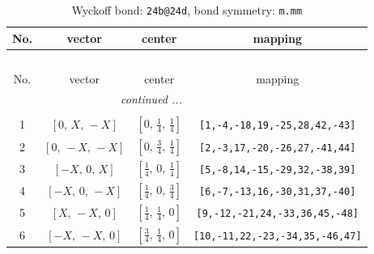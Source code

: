 \documentclass[fleqn,8pt]{jsarticle}
\begin{document}
\begin{longtable}{cccc}
\caption{Wyckoff bond: {\tt 24b@24d}, bond symmetry: {\tt m.mm}}
 \\
 \hline \hline
No. & vector & center & mapping \\ \hline \endfirsthead

\multicolumn{3}{l}{\tablename\ \thetable{}} \\
 \hline \hline
No. & vector & center & mapping \\ \hline \endhead

 \hline \hline
\multicolumn{3}{r}{\footnotesize\it continued ...} \\ \endfoot

 \hline \hline
\multicolumn{3}{r}{} \\ \endlastfoot

1 & $\left[ 0,\, X,\, - X \right]$ & $\left[ 0,\, \frac{1}{4},\, \frac{1}{4} \right]$ & {\tt [1,-4,-18,19,-25,28,42,-43]} \\ \hline
2 & $\left[ 0,\, - X,\, - X \right]$ & $\left[ 0,\, \frac{3}{4},\, \frac{1}{4} \right]$ & {\tt [2,-3,17,-20,-26,27,-41,44]} \\ \hline
3 & $\left[ - X,\, 0,\, X \right]$ & $\left[ \frac{1}{4},\, 0,\, \frac{1}{4} \right]$ & {\tt [5,-8,14,-15,-29,32,-38,39]} \\ \hline
4 & $\left[ - X,\, 0,\, - X \right]$ & $\left[ \frac{1}{4},\, 0,\, \frac{3}{4} \right]$ & {\tt [6,-7,-13,16,-30,31,37,-40]} \\ \hline
5 & $\left[ X,\, - X,\, 0 \right]$ & $\left[ \frac{1}{4},\, \frac{1}{4},\, 0 \right]$ & {\tt [9,-12,-21,24,-33,36,45,-48]} \\ \hline
6 & $\left[ - X,\, - X,\, 0 \right]$ & $\left[ \frac{3}{4},\, \frac{1}{4},\, 0 \right]$ & {\tt [10,-11,22,-23,-34,35,-46,47]} \\
\end{longtable}
\renewcommand{\arraystretch}{1.2}
\end{document}
